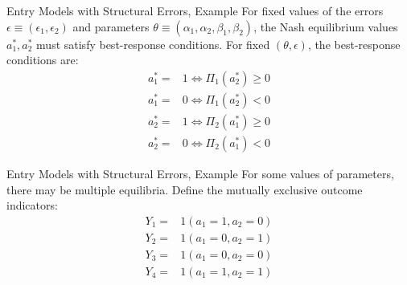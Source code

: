 \begin{frame}{Entry Models with Structural Errors, Example}
For fixed values of the errors $\epsilon \equiv (\epsilon_1, \epsilon_2)$ and parameters $\theta \equiv (\alpha_1, \alpha_2, \beta_1, \beta_2)$, the Nash equilibrium values $a^*_1, a^*_2$ must satisfy best-response conditions. For fixed $(\theta, \epsilon)$, the best-response conditions are:
\begin{equation*}
\begin{split}
a^*_1 = & 1 \Leftrightarrow \Pi_1 (a^*_2) \geq 0 \\
a^*_1 = & 0 \Leftrightarrow \Pi_1 (a^*_2) < 0 \\
a^*_2 = & 1 \Leftrightarrow \Pi_2 (a^*_1) \geq 0 \\
a^*_2 = & 0 \Leftrightarrow \Pi_2 (a^*_1) < 0
\end{split}
\end{equation*}
\end{frame}

\begin{frame}{Entry Models with Structural Errors, Example}
For some values of parameters, there may be multiple equilibria. Define the mutually exclusive outcome indicators:
\begin{equation*}
\begin{split}
Y_1 = & 1 (a_1 = 1, a_2 = 0) \\
Y_2 = & 1 (a_1 = 0, a_2 = 1) \\
Y_3 = & 1 (a_1 = 0, a_2 = 0) \\
Y_4 = & 1 (a_1 = 1, a_2 = 1) 
\end{split}
\end{equation*}
\end{frame}

